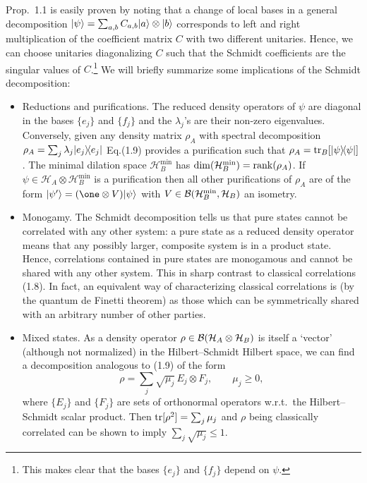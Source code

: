 \documentclass[11pt,a4paper]{article}
\theoremstyle{plain}
\theoremstyle{definition}
\theoremstyle{remark}
\numberwithin{equation}{section}
\begin{document}
Prop.~1.1 is easily proven by noting that a change of local bases in a general decomposition $|\psi\rangle=\sum_{a,b} C_{a,b}|a\rangle\otimes |b\rangle$ corresponds to left and right multiplication of the coefficient matrix $C$ with two different unitaries. Hence, we can choose unitaries diagonalizing $C$ such that the Schmidt coefficients are the singular values of $C$.\footnote{This makes clear that the bases $\{e_j\}$ and $\{f_j\}$ depend on $\psi$.} We will briefly summarize some implications of the Schmidt decomposition:
\begin{itemize}
    \item Reductions and purifications. The reduced density operators of $\psi$ are diagonal in the bases $\{e_j\}$ and $\{f_j\}$ and the $\lambda_j$'s are their non-zero eigenvalues. Conversely, given any density matrix $\rho_A$ with spectral decomposition $\rho_A=\sum_j \lambda_j |e_j\rangle\!\langle e_j|$ Eq.(1.9) provides a purification such that $\rho_A=\operatorname{tr}_B[|\psi\rangle\!\langle\psi|]$. The minimal dilation space $\mathcal{H}_B^{\min}$ has $\dim(\mathcal{H}_B^{\min})=\operatorname{rank}(\rho_A)$. If $\psi\in \mathcal{H}_A\otimes \mathcal{H}_B^{\min}$ is a purification then all other purifications of $\rho_A$ are of the form $\ket{\psi'}=(\one\otimes V)\ket{\psi}$ with $V\in \mathcal{B}(\mathcal{H}_B^{\min},\mathcal{H}_B)$ an isometry.
    \item Monogamy. The Schmidt decomposition tells us that pure states cannot be correlated with any other system: a pure state as a reduced density operator means that any possibly larger, composite system is in a product state. Hence, correlations contained in pure states are monogamous and cannot be shared with any other system. This in sharp contrast to classical correlations (1.8). In fact, an equivalent way of characterizing classical correlations is (by the quantum de Finetti theorem) as those which can be symmetrically shared with an arbitrary number of other parties.
    \item Mixed states. As a density operator $\rho\in \mathcal{B}(\mathcal{H}_A\otimes \mathcal{H}_B)$ is itself a `vector' (although not normalized) in the Hilbert--Schmidt Hilbert space, we can find a decomposition analogous to (1.9) of the form
          \begin{equation}
              \rho = \sum_j \sqrt{\mu_j}\,E_j\otimes F_j,\qquad \mu_j\ge 0,
          \end{equation}
          where $\{E_j\}$ and $\{F_j\}$ are sets of orthonormal operators w.r.t.\ the Hilbert--Schmidt scalar product. Then $\operatorname{tr}[\rho^2]=\sum_j \mu_j$ and $\rho$ being classically correlated can be shown to imply $\sum_j \sqrt{\mu_j}\le 1$.
\end{itemize}
\end{document}
